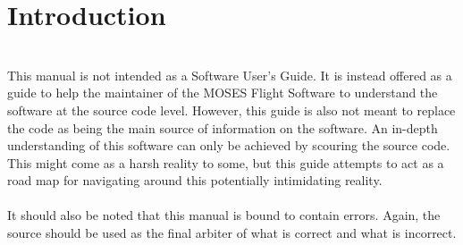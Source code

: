\section{Introduction}
\hrulefill
\\
This manual is not intended as a Software User's Guide. It is instead offered as
a guide to help the maintainer of the MOSES Flight Software to understand the
software at the source code level. However, this guide is also not meant to replace
the code as being the main source of information on the software. An in-depth understanding
of this software can only be achieved by scouring the source code. This might come as a
harsh reality to some, but this guide attempts to act as a road map for navigating around
this potentially intimidating reality.\\
\\
It should also be noted that this manual is bound to contain errors. Again, the source should
be used as the final arbiter of what is correct and what is incorrect.

